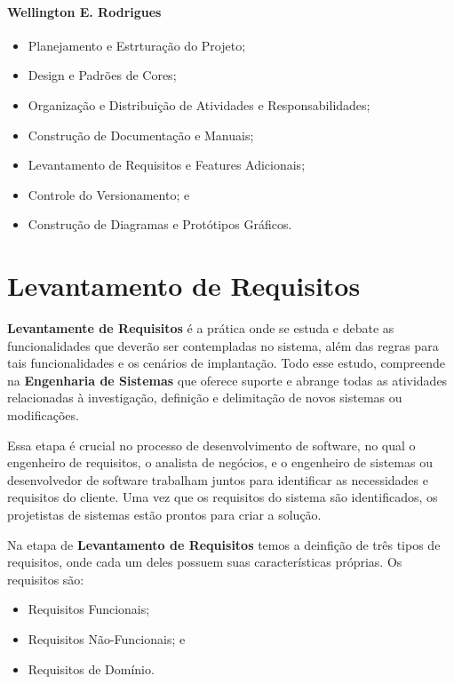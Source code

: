 \documentclass[a4paper,12pt]{article}
\begin{document}
\paragraph{Wellington E. Rodrigues}
\begin{itemize}
		\item Planejamento e Estrturação do Projeto;
    	\item Design e Padrões de Cores;
    	\item Organização e Distribuição de Atividades e Responsabilidades;
    	\item Construção de Documentação e Manuais;
   		\item Levantamento de Requisitos e Features Adicionais;
    	\item Controle do Versionamento; e
    	\item Construção de Diagramas e Protótipos Gráficos.

\end{itemize}

\section{Levantamento de Requisitos}
\textbf{Levantamente de Requisitos} é a prática onde se estuda e debate as funcionalidades que deverão ser contempladas no sistema, 
além das regras para tais funcionalidades e os cenários de implantação. Todo esse estudo, compreende na \textbf{Engenharia de Sistemas} 
que oferece suporte e abrange todas as atividades relacionadas à investigação, definição e delimitação de novos sistemas ou modificações.

Essa etapa é crucial no processo de desenvolvimento de software, no qual o engenheiro de requisitos, o analista de negócios, e 
o engenheiro de sistemas ou desenvolvedor de software trabalham juntos para identificar as necessidades e requisitos do cliente. Uma 
vez que os requisitos do sistema são identificados, os projetistas de sistemas estão prontos para criar a solução.

Na etapa de \textbf{Levantamento de Requisitos} temos a deinfição de três tipos de requisitos, onde cada um deles possuem suas 
características próprias. Os requisitos são:
\begin{itemize}
	\item Requisitos Funcionais;
	\item Requisitos Não-Funcionais; e
	\item Requisitos de Domínio.
\end{itemize}
\end{document}
